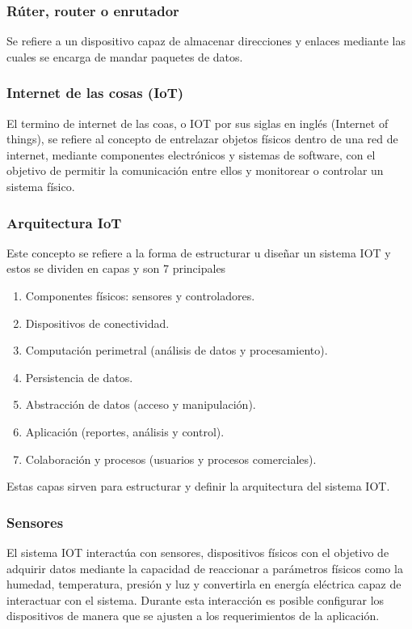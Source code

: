 \subsubsection{Rúter, router o enrutador}
Se refiere a un dispositivo capaz de almacenar direcciones y enlaces mediante las cuales se encarga de mandar paquetes de datos.\cite{kamal_2017}

\subsubsection{Internet de las cosas (IoT)}
El termino de internet de las coas, o IOT por sus siglas en inglés (Internet of things), se refiere al concepto de entrelazar objetos físicos dentro de una red de internet, mediante componentes electrónicos y sistemas de software, con el objetivo de permitir la comunicación entre ellos y monitorear o controlar un sistema físico. \cite{kamal_2017}

\subsubsection{Arquitectura IoT}
Este concepto se refiere a la forma de estructurar u diseñar un sistema IOT y estos se dividen en capas y son 7 principales
\begin{enumerate}
    \renewcommand\labelenumi{\arabic{enumi}.}
    \item Componentes físicos: sensores y controladores.
    \item Dispositivos de conectividad.
    \item Computación perimetral (análisis de datos y procesamiento).
    \item Persistencia de datos.
    \item Abstracción de datos (acceso y manipulación).
    \item Aplicación (reportes, análisis y control).
    \item Colaboración y procesos (usuarios y procesos comerciales).
\end{enumerate}
Estas capas sirven para estructurar y definir la arquitectura del sistema IOT.\cite{kamal_2017}


\subsubsection{Sensores}
El sistema IOT interactúa con sensores, dispositivos físicos con el objetivo de adquirir datos mediante la capacidad de reaccionar a parámetros físicos como la humedad, temperatura, presión y luz y convertirla en energía eléctrica capaz de interactuar con el sistema. Durante esta interacción es posible configurar los dispositivos de manera que se ajusten a los requerimientos de la aplicación.\cite{kamal_2017}


